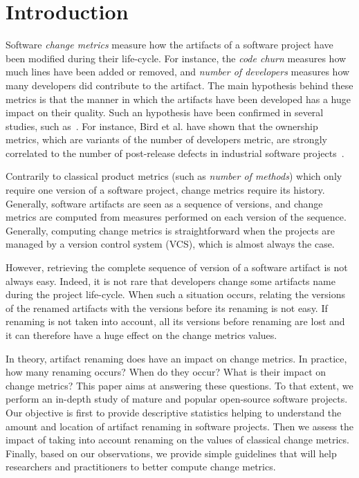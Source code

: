 \section{Introduction}
\label{sec:intro}

Software \emph{change metrics} measure how the artifacts of a software project have been modified during their life-cycle. For instance, the \emph{code churn} measures how much lines have been added or removed, and \emph{number of developers} measures how many developers did contribute to the artifact. The main hypothesis behind these metrics is that the manner in which the artifacts have been developed has a huge impact on their quality. Such an hypothesis have been confirmed in several studies, such as~\cite{graves_predicting_2000,nagappan_use_2005,weyuker_too_2008,moser_comparative_2008,matsumoto_analysis_2010,bird_dont_2011,dambros_evaluating_2012,illes-seifert_exploring_2010,posnett_dual_2013}. For instance, Bird et al. have shown that the ownership metrics, which are variants of the number of developers metric, are strongly correlated to the number of post-release defects in industrial software projects~\cite{bird_dont_2011}.

Contrarily to classical product metrics (such as \emph{number of methods}) which only require one version of a software project, change metrics require its history. Generally, software artifacts are seen as a sequence of versions, and change metrics are computed from measures performed on each version of the sequence. Generally, computing change metrics is straightforward when the projects are managed by a version control system (VCS), which is almost always the case.

However, retrieving the complete sequence of version of a software artifact is not always easy. Indeed, it is not rare that developers change some artifacts name during the project life-cycle. When such a situation occurs, relating the versions of the renamed artifacts with the versions before its renaming is not easy. If renaming is not taken into account, all its versions before renaming are lost and it can therefore have a huge effect on the change metrics values.

In theory, artifact renaming does have an impact on change metrics. In practice, how many renaming occurs? When do they occur? What is their impact on change metrics? This paper aims at answering these questions. To that extent, we perform an in-depth study of mature and popular open-source software projects. Our objective is first to provide descriptive statistics helping to understand the amount and location of artifact renaming in software projects. Then we assess the impact of taking into account renaming on the values of classical change metrics. Finally, based on our observations, we provide simple guidelines that will help researchers and practitioners to better compute change metrics.

